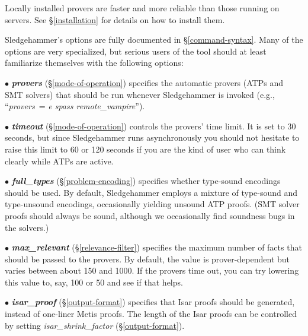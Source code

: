 \documentclass[a4paper,12pt]{article}
\begin{document}

Locally installed provers are faster and more reliable than those running on
servers. See \S\ref{installation} for details on how to install them.


Sledgehammer's options are fully documented in \S\ref{command-syntax}. Many of
the options are very specialized, but serious users of the tool should at least
familiarize themselves with the following options:

\begin{enum}
\item[$\bullet$] \textbf{\textit{provers}} (\S\ref{mode-of-operation}) specifies
the automatic provers (ATPs and SMT solvers) that should be run whenever
Sledgehammer is invoked (e.g., ``\textit{provers}~= \textit{e spass
remote\_vampire}'').

\item[$\bullet$] \textbf{\textit{timeout}} (\S\ref{mode-of-operation}) controls
the provers' time limit. It is set to 30 seconds, but since Sledgehammer runs
asynchronously you should not hesitate to raise this limit to 60 or 120 seconds
if you are the kind of user who can think clearly while ATPs are active.

\item[$\bullet$] \textbf{\textit{full\_types}} (\S\ref{problem-encoding})
specifies whether type-sound encodings should be used. By default, Sledgehammer
employs a mixture of type-sound and type-unsound encodings, occasionally
yielding unsound ATP proofs. (SMT solver proofs should always be sound, although
we occasionally find soundness bugs in the solvers.)

\item[$\bullet$] \textbf{\textit{max\_relevant}} (\S\ref{relevance-filter})
specifies the maximum number of facts that should be passed to the provers. By
default, the value is prover-dependent but varies between about 150 and 1000. If
the provers time out, you can try lowering this value to, say, 100 or 50 and see
if that helps.

\item[$\bullet$] \textbf{\textit{isar\_proof}} (\S\ref{output-format}) specifies
that Isar proofs should be generated, instead of one-liner Metis proofs. The
length of the Isar proofs can be controlled by setting
\textit{isar\_shrink\_factor} (\S\ref{output-format}).
\end{enum}
\end{document}
